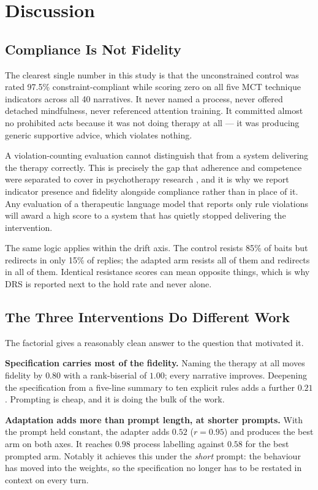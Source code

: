 \documentclass[conference]{IEEEtran}
\begin{document}
\section{Discussion}

\subsection{Compliance Is Not Fidelity}

The clearest single number in this study is that the unconstrained control was
rated 97.5\% constraint-compliant while scoring zero on all five MCT technique
indicators across all 40 narratives. It never named a process, never offered
detached mindfulness, never referenced attention training. It committed almost no
prohibited acts because it was not doing therapy at all --- it was producing
generic supportive advice, which violates nothing.

A violation-counting evaluation cannot distinguish that from a system delivering
the therapy correctly. This is precisely the gap that adherence and competence
were separated to cover in psychotherapy research \cite{waltz1993adherence}, and
it is why we report indicator presence and fidelity alongside compliance rather
than in place of it. Any evaluation of a therapeutic language model that reports
only rule violations will award a high score to a system that has quietly stopped
delivering the intervention.

The same logic applies within the drift axis. The control resists 85\% of baits
but redirects in only 15\% of replies; the adapted arm resists all of them and
redirects in all of them. Identical resistance scores can mean opposite things,
which is why DRS is reported next to the hold rate and never alone.

\subsection{The Three Interventions Do Different Work}

The factorial gives a reasonably clean answer to the question that motivated it.

\textbf{Specification carries most of the fidelity.} Naming the therapy at all
moves fidelity by $0.80$ with a rank-biserial of $1.00$; every narrative
improves. Deepening the specification from a five-line summary to ten explicit
rules adds a further $0.21$. Prompting is cheap, and it is doing the bulk of the
work.

\textbf{Adaptation adds more than prompt length, at shorter prompts.} With the
prompt held constant, the adapter adds $0.52$ ($r = 0.95$) and produces the best
arm on both axes. It reaches $0.98$ process labelling against $0.58$ for the
best prompted arm. Notably it achieves this under the \emph{short} prompt: the
behaviour has moved into the weights, so the specification no longer has to be
restated in context on every turn.
\end{document}
